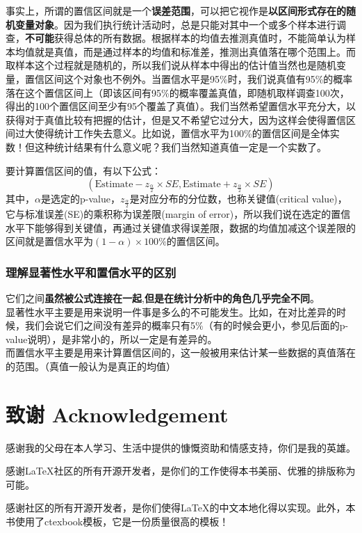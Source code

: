 \documentclass[UTF8]{ctexbook}
\begin{document}
事实上，所谓的置信区间就是一个\textbf{误差范围}，可以把它视作是\textbf{以区间形式存在的随机变量对象}。因为我们执行统计活动时，总是只能对其中一个或多个样本进行调查，\textbf{不可能}获得总体的所有数据。根据样本的均值去推测真值时，不能简单认为样本均值就是真值，而是通过样本的均值和标准差，推测出真值落在哪个范围上。而取样本这个过程就是随机的，所以我们说从样本中得出的估计值当然也是随机变量，置信区间这个对象也不例外。当置信水平是95\%时，我们说真值有95\%的概率落在这个置信区间上（即该区间有95\%的概率覆盖真值，即随机取样调查100次，得出的100个置信区间至少有95个覆盖了真值）。我们当然希望置信水平充分大，以获得对于真值比较有把握的估计，但是又不希望它过分大，因为这样会使得置信区间过大使得统计工作失去意义。比如说，置信水平为100\%的置信区间是全体实数！但这种统计结果有什么意义呢？我们当然知道真值一定是一个实数了。

要计算置信区间的值，有以下公式：
\[
\left(\text{Estimate}-z_{\frac{\alpha}{2}}\times SE,\text{Estimate}+z_{\frac{\alpha}{2}}\times SE\right)
\]
其中，$\alpha$是选定的p-value，$z_{\frac{\alpha}{2}}$是对应分布的分位数，也称关键值(critical value)，它与标准误差(SE)的乘积称为误差限(margin of error)，所以我们说在选定的置信水平下能够得到关键值，再通过关键值求得误差限，数据的均值加减这个误差限的区间就是置信水平为$(1-\alpha)\times 100\%$的置信区间。

\subsection{理解显著性水平和置信水平的区别}
它们之间\textbf{虽然被公式连接在一起},\textbf{但是在统计分析中的角色几乎完全不同}。\\
\indent 显著性水平主要是用来说明一件事是多么的不可能发生。比如，在对比差异的时候，我们会说它们之间没有差异的概率只有5\%（有的时候会更小，参见后面的p-value说明），是非常小的，所以一定是有差异的。\\
\indent 而置信水平主要是用来计算置信区间的，这一般被用来估计某一些数据的真值落在的范围。（真值一般认为是真正的均值）

\chapter*{致谢 Acknowledgement}
感谢我的父母在本人学习、生活中提供的慷慨资助和情感支持，你们是我的英雄。

感谢\LaTeX 社区的所有开源开发者，是你们的工作使得本书美丽、优雅的排版称为可能。

感谢\CTeX 社区的所有开源开发者，是你们使得\LaTeX 的中文本地化得以实现。此外，本书使用了ctexbook模板，它是一份质量很高的模板！
\end{document}
